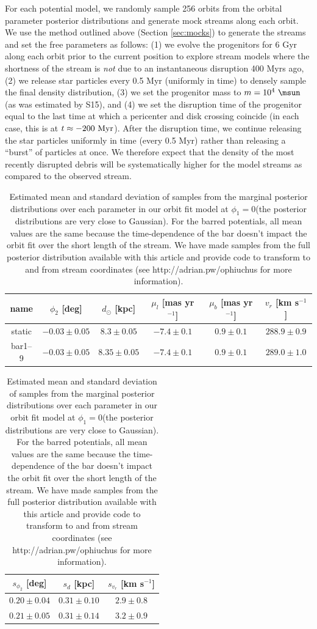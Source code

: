\documentclass[letterpaper,12pt,preprint]{aastex}
\renewcommand{\changes}[1]{#1}
\begin{document}
For each potential model, we randomly sample 256 orbits from the orbital parameter posterior distributions and generate mock streams along each orbit. We use the method outlined above (Section \ref{sec:mocks}) to generate the streams and set the free parameters as follows: (1) we evolve the progenitors for 6 Gyr along each orbit prior to the current position to explore stream models where the shortness of the stream is \emph{not} due to an instantaneous disruption 400 Myrs ago, (2) we release star particles every 0.5 Myr (uniformly in time) to densely sample the final density distribution, (3) we set the progenitor mass to $m=10^4~\msun$ (as was estimated by S15), and (4) we set the disruption time of the progenitor equal to the last time at which a pericenter and disk crossing coincide (in each case, this is at $t \approx -200~{\rm Myr}$). After the disruption time, we continue releasing the star particles uniformly in time (every 0.5 Myr) rather than releasing a ``burst'' of particles at once. We therefore expect that the density of the most recently disrupted debris will be systematically higher for the model streams as compared to the observed stream.

\begin{table}[ht]
\footnotesize
\begin{center}
	\begin{tabular}{cccccc}
	\toprule
	name & $\phi_2$ [deg] & $d_\odot$ [kpc] & $\mu_l$ [mas yr$^{-1}$] & $\mu_b$ [mas yr$^{-1}$] & $v_r$ [km s$^{-1}$]\\\midrule
	static & $-0.03\pm0.05$ & $8.3\pm0.05$ & $-7.4\pm0.1$ & $0.9\pm0.1$ & $288.9\pm0.9$\\
	bar1--9 & $-0.03\pm0.05$ & $8.35\pm0.05$ & $-7.4\pm0.1$ & $0.9\pm0.1$ & $289.0\pm1.0$\\
	\bottomrule
	\end{tabular}

	\begin{tabular}{ccc}
	\toprule
	$s_{\phi_2}$ [deg] & $s_{d}$ [kpc] & $s_{v_r}$ [km s$^{-1}$]\\\midrule
	$0.20\pm0.04$ & $0.31\pm0.10$ & $2.9\pm0.8$\\
	$0.21\pm0.05$ & $0.31\pm0.14$ & $3.2\pm0.9$\\
	\bottomrule
	\end{tabular}
	\caption{Estimated mean and standard deviation of samples from the marginal posterior distributions over each parameter in our orbit fit model \changes{at $\phi_1 = 0$}(the posterior distributions are very close to Gaussian). For the barred potentials, all mean values are the same because the time-dependence of the bar doesn't impact the orbit fit over the short length of the stream. We have made samples from the full posterior distribution available with this article and provide code to transform to and from stream coordinates (see http://adrian.pw/ophiuchus for more information).\label{tbl:param-means} }
\end{center}
\end{table}
\end{document}
